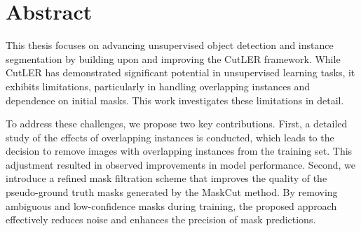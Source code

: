 \chapter*{Abstract}
This thesis focuses on advancing unsupervised object detection and instance segmentation by building upon and improving the CutLER framework. While CutLER has demonstrated significant potential in unsupervised learning tasks, it exhibits limitations, particularly in handling overlapping instances and dependence on initial masks. This work investigates these limitations in detail.

To address these challenges, we propose two key contributions. First, a detailed study of the effects of overlapping instances is conducted, which leads to the decision to remove images with overlapping instances from the training set. This adjustment resulted in observed improvements in model performance. Second, we introduce a refined mask filtration scheme that improves the quality of the pseudo-ground truth masks generated by the MaskCut method. By removing ambiguous and low-confidence masks during training, the proposed approach effectively reduces noise and enhances the precision of mask predictions.

